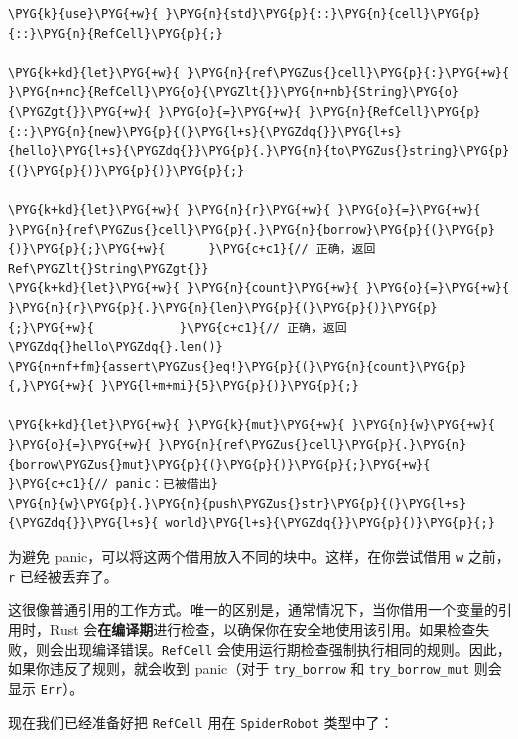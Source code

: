 \begin{Verbatim}[commandchars=\\\{\},breaklines=true,breakanywhere=true,fontsize=\codefont,xleftmargin=17bp]
\PYG{k}{use}\PYG{+w}{ }\PYG{n}{std}\PYG{p}{::}\PYG{n}{cell}\PYG{p}{::}\PYG{n}{RefCell}\PYG{p}{;}

\PYG{k+kd}{let}\PYG{+w}{ }\PYG{n}{ref\PYGZus{}cell}\PYG{p}{:}\PYG{+w}{ }\PYG{n+nc}{RefCell}\PYG{o}{\PYGZlt{}}\PYG{n+nb}{String}\PYG{o}{\PYGZgt{}}\PYG{+w}{ }\PYG{o}{=}\PYG{+w}{ }\PYG{n}{RefCell}\PYG{p}{::}\PYG{n}{new}\PYG{p}{(}\PYG{l+s}{\PYGZdq{}}\PYG{l+s}{hello}\PYG{l+s}{\PYGZdq{}}\PYG{p}{.}\PYG{n}{to\PYGZus{}string}\PYG{p}{(}\PYG{p}{)}\PYG{p}{)}\PYG{p}{;}

\PYG{k+kd}{let}\PYG{+w}{ }\PYG{n}{r}\PYG{+w}{ }\PYG{o}{=}\PYG{+w}{ }\PYG{n}{ref\PYGZus{}cell}\PYG{p}{.}\PYG{n}{borrow}\PYG{p}{(}\PYG{p}{)}\PYG{p}{;}\PYG{+w}{      }\PYG{c+c1}{// 正确，返回Ref\PYGZlt{}String\PYGZgt{}}
\PYG{k+kd}{let}\PYG{+w}{ }\PYG{n}{count}\PYG{+w}{ }\PYG{o}{=}\PYG{+w}{ }\PYG{n}{r}\PYG{p}{.}\PYG{n}{len}\PYG{p}{(}\PYG{p}{)}\PYG{p}{;}\PYG{+w}{            }\PYG{c+c1}{// 正确，返回\PYGZdq{}hello\PYGZdq{}.len()}
\PYG{n+nf+fm}{assert\PYGZus{}eq!}\PYG{p}{(}\PYG{n}{count}\PYG{p}{,}\PYG{+w}{ }\PYG{l+m+mi}{5}\PYG{p}{)}\PYG{p}{;}

\PYG{k+kd}{let}\PYG{+w}{ }\PYG{k}{mut}\PYG{+w}{ }\PYG{n}{w}\PYG{+w}{ }\PYG{o}{=}\PYG{+w}{ }\PYG{n}{ref\PYGZus{}cell}\PYG{p}{.}\PYG{n}{borrow\PYGZus{}mut}\PYG{p}{(}\PYG{p}{)}\PYG{p}{;}\PYG{+w}{  }\PYG{c+c1}{// panic：已被借出}
\PYG{n}{w}\PYG{p}{.}\PYG{n}{push\PYGZus{}str}\PYG{p}{(}\PYG{l+s}{\PYGZdq{}}\PYG{l+s}{ world}\PYG{l+s}{\PYGZdq{}}\PYG{p}{)}\PYG{p}{;}
\end{Verbatim}

为避免 panic，可以将这两个借用放入不同的块中。这样，在你尝试借用 \texttt{w} 之前，\texttt{r} 已经被丢弃了。

这很像普通引用的工作方式。唯一的区别是，通常情况下，当你借用一个变量的引用时，Rust 会\textbf{在编译期}进行检查，以确保你在安全地使用该引用。如果检查失败，则会出现编译错误。\texttt{RefCell} 会使用运行期检查强制执行相同的规则。因此，如果你违反了规则，就会收到 panic（对于 \texttt{try\_borrow} 和 \texttt{try\_borrow\_mut} 则会显示 \texttt{Err}）。

现在我们已经准备好把 \texttt{RefCell} 用在 \texttt{SpiderRobot} 类型中了：

